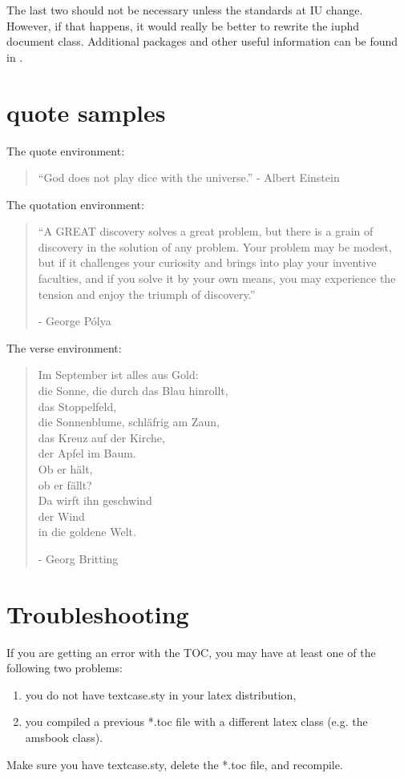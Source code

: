 
The last two should not be necessary unless the standards at IU change.  However, if that happens, it would really be better to
rewrite the iuphd document class.  Additional packages and other useful information can be found in \cite{mittelbach2004latex}.

\section{quote samples}
The quote environment:
\begin{quote}
``God does not play dice with the universe.'' - Albert Einstein
\end{quote}
The quotation environment:
\begin{quotation}
 ``A GREAT discovery solves a great problem, but there is a grain of discovery in the solution of any problem.
 Your problem may be modest, but if it challenges your curiosity and brings into play your inventive faculties,
 and if you solve it by your own means, you may experience the tension and enjoy the triumph of discovery.''
 
 - George P\'olya
\end{quotation}
The verse environment:
\begin{verse}
Im September ist alles aus Gold:\\ 
die Sonne, die durch das Blau hinrollt,\\
das Stoppelfeld,\\
die Sonnenblume, schläfrig am Zaun,\\
das Kreuz auf der Kirche,\\
der Apfel im Baum.\\
Ob er h\"alt,\\
ob er f\"allt? \\
Da wirft ihn geschwind\\
der Wind\\
in die goldene Welt.

- Georg Britting
\end{verse}

\section{Troubleshooting}

If you are getting an error with the TOC, you may have at least one of the following two problems:
\begin{enumerate}
 \item you do not have textcase.sty in your latex distribution,
 \item you compiled a previous *.toc file with a different latex class (e.g. the amsbook class).
\end{enumerate}
Make sure you have textcase.sty, delete the *.toc file, and recompile.
